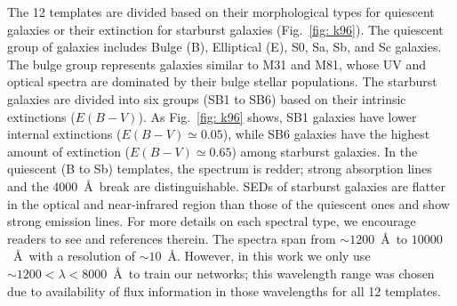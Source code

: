     The 12 templates are divided based on their morphological types for quiescent galaxies or their extinction for starburst galaxies (Fig.~\ref{fig: k96}). 
    The quiescent group of galaxies includes Bulge (B), Elliptical (E), S0, Sa, Sb, and Sc galaxies.
    The bulge group represents galaxies similar to M31 and M81, whose UV and optical spectra are dominated by their bulge stellar populations.
    The starburst galaxies are divided into six groups (SB1 to SB6) based on their intrinsic extinctions ($E(B-V)$). 
    As Fig.~\ref{fig: k96} shows, SB1 galaxies have lower internal extinctions ($E(B-V) \simeq 0.05$), while SB6 galaxies have the highest amount of extinction ($E(B-V) \simeq 0.65$) among starburst galaxies. 
    In the quiescent (B to Sb) templates, the spectrum is redder; strong absorption lines and the 4000~\AA~break are distinguishable.
    SEDs of starburst galaxies are flatter in the optical and near-infrared region than those of the quiescent ones and show strong emission lines.
    For more details on each spectral type, we encourage readers to see  and references therein. 
   The  spectra span from $\sim1200$~\AA~to $10000$~\AA~with a resolution of $\sim 10$~\AA.
    However, in this work we only use $\sim1200< \lambda < 8000$~\AA~to train our networks; 
    this wavelength range was chosen due to availability of flux information in those wavelengths for all 12 templates. 

